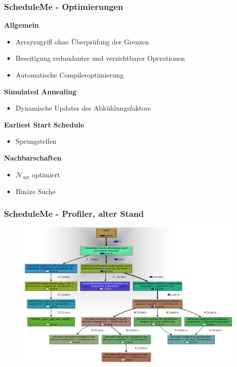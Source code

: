 \documentclass[aspectratio=169]{beamer}
\begin{document}
\begin{frame}[t]
\frametitle{ScheduleMe - Optimierungen}

	\vspace{-8pt}
	\textbf{Allgemein}
	\begin{itemize}
		\item Arrayzugriff ohne Überprüfung der Grenzen
		\item Beseitigung redundanter und verzichtbarer Operationen
		\item Automatische Compileroptimierung
	\end{itemize}

	\vspace{6pt}
	\textbf{Simulated Annealing}
	\begin{itemize}
		\item Dynamische Updates des Abkühlungsfaktors
	\end{itemize}

	\vspace{6pt}
	\textbf{Earliest Start Schedule}
	\begin{itemize}
		\item Sprungstellen
	\end{itemize}

	\vspace{6pt}
	\textbf{Nachbarschaften}
	\begin{itemize}
		\item $\mathcal{N}_{api}$ optimiert
		\item Binäre Suche
	\end{itemize}

\end{frame}


\begin{frame}
	\frametitle{ScheduleMe - Profiler, alter Stand}
	
		\vspace{-6pt}
	
		\begin{figure}
			\centering
			\includegraphics[scale=0.237]{profiler_old_O0_full.png}
		\end{figure}
	
	\end{frame}
	
\end{document}
